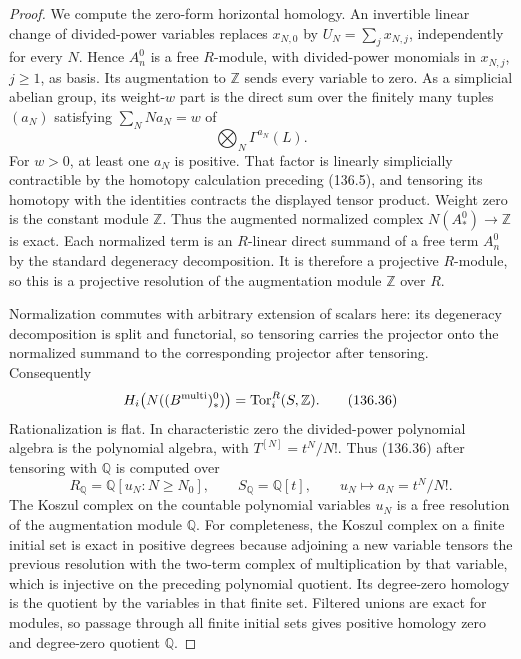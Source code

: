 \documentclass[11pt,a4paper]{article}
\theoremstyle{definition}\newtheorem{definition}[theorem]{Definition}
\theoremstyle{remark}\newtheorem{remark}[theorem]{Remark}
\begin{document}
\begin{proof}
We compute the zero-form horizontal homology.  An
invertible linear change of divided-power variables
replaces $x_{N,0}$ by $U_N=\sum_jx_{N,j}$, independently
for every $N$.  Hence $A_n^0$ is a free $R$-module,
with divided-power monomials in $x_{N,j}$, $j\geq1$,
as basis.  Its augmentation to $\mathbb Z$ sends every
variable to zero.  As a simplicial abelian group, its
weight-$w$ part is the direct sum over the finitely
many tuples $(a_N)$ satisfying $\sum_N N a_N=w$ of
\[
                         \bigotimes_N\Gamma^{a_N}(L).
                                                               \tag{136.35}
\]
For $w>0$, at least one $a_N$ is positive.  That factor
is linearly simplicially contractible by the homotopy
calculation preceding (136.5), and tensoring its
homotopy with the identities contracts the displayed
tensor product.  Weight zero is the constant module
$\mathbb Z$.  Thus the augmented normalized complex
$N(A_*^0)\to\mathbb Z$ is exact.  Each normalized term
is an $R$-linear direct summand of a free term $A_n^0$
by the standard degeneracy decomposition.  It is
therefore a projective $R$-module, so this is a
projective resolution of the augmentation module
$\mathbb Z$ over $R$.

Normalization commutes with arbitrary extension of
scalars here: its degeneracy decomposition is split
and functorial, so tensoring carries the projector
onto the normalized summand to the corresponding
projector after tensoring.  Consequently
\[
 H_i\bigl(N((B^{\rm multi})_*^0)\bigr)
                  =\operatorname{Tor}_i^R(S,\mathbb Z).
                                                               \tag{136.36}
\]
Rationalization is flat.  In characteristic zero the
divided-power polynomial algebra is the polynomial
algebra, with $T^{[N]}=t^N/N!$.  Thus (136.36) after
tensoring with $\mathbb Q$ is computed over
\[
 R_{\mathbb Q}=\mathbb Q[u_N:N\geq N_0],\qquad
 S_{\mathbb Q}=\mathbb Q[t],\qquad
                     u_N\longmapsto a_N=t^N/N!.
                                                               \tag{136.37}
\]
The Koszul complex on the countable polynomial
variables $u_N$ is a free resolution of the
augmentation module $\mathbb Q$.  For completeness,
the Koszul complex on a finite initial set is exact
in positive degrees because adjoining a new
variable tensors the previous resolution with the
two-term complex of multiplication by that variable,
which is injective on the preceding polynomial
quotient.  Its degree-zero homology is the quotient
by the variables in that finite set.  Filtered
unions are exact for modules, so passage through
all finite initial sets gives positive homology
zero and degree-zero quotient $\mathbb Q$.


\end{proof}
\end{document}
